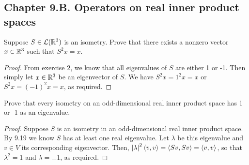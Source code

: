 \subsection*{Chapter 9.B. Operators on real inner product spaces}


\begin{exercise}{1}
  Suppose $S\in\mathcal{L}(\mathbb{R}^3)$ is an isometry. Prove that there exists a nonzero vector $x\in\mathbb{R}^3$ such that $S^2x=x$.
\end{exercise}
\begin{proof}
 From exercise 2, we know that all eigenvalues of $S$ are either 1 or -1. Then simply let $x\in\mathbb{R}^3$ be an eigenvector of $S$. We have $S^2x=1^2x=x$ or $S^2x=(-1)^2x=x$, as required.
\end{proof}

\begin{exercise}{2}
  Prove that every isometry on an odd-dimensional real inner product space has 1 or -1 as an eigenvalue.
\end{exercise}
\begin{proof}
 Suppose $S$ is an isometry in an odd-dimensional real inner product space. By 9.19 we know $S$ has at least one real eigenvalue. Let $\lambda$ be this eigenvalue and $v\in V$ its corresponding eigenvector. Then, $\left\lvert \lambda\right\rvert^2\langle v,v\rangle=\langle Sv,Sv\rangle=\langle v,v\rangle$, so that $\lambda^2=1$ and $\lambda=\pm 1$, as required.
\end{proof}

